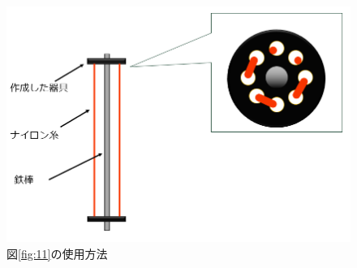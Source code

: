 \begin{figure}[ht]
  \begin{minipage}[b]{0.49\hsize}
    \centering
    \includegraphics[scale=0.3]{pic/tukau2.PNG}
    \caption{図\ref{fig:11}の使用方法}
    \label{fig:13}
  \end{minipage} 
  \begin{minipage}[b]{0.49\hsize}
    \centering  %

\end{minipage}
\end{figure}
